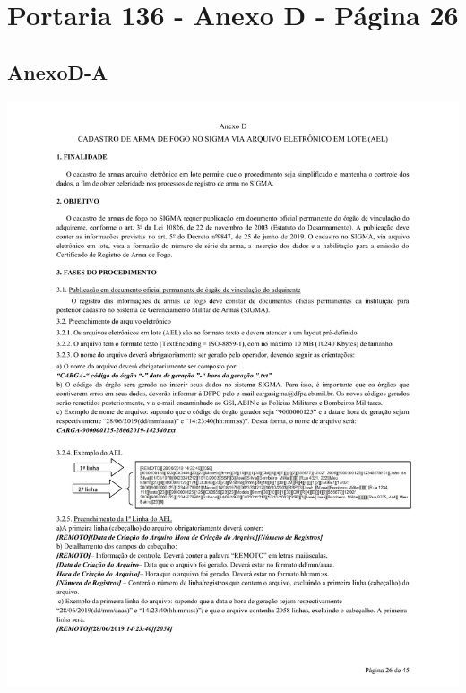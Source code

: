 \chapter{Portaria 136 - Anexo D - Página 26}
\section{AnexoD-A}
\includegraphics[scale=0.8]{imagens/AnexoA1-AnexoD-portaria-136}
\label{sec:anexoA1}



